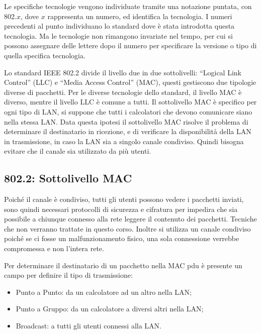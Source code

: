 \documentclass{article}
\numberwithin{equation}{subsection}
\begin{document}
Le specifiche tecnologie vengono individuate tramite una notazione puntata, con 802.$x$, dove $x$ rappresenta un numero, ed identifica la tecnologia. I numeri precedenti al punto individuano lo standard dove è 
stata introdotta questa tecnologia. Ma le tecnologie non rimangono invariate nel tempo, per cui si possono assegnare delle lettere dopo il numero per specificare la versione o tipo di quella specifica tecnologia. 

Lo standard IEEE 802.2 divide il livello due in due sottolivelli: ``Logical Link Control'' (LLC) e ``Media Access Control'' (MAC), questi gestiscono due tipologie diverse di pacchetti. Per le diverse tecnologie dello standard, il livello MAC è diverso, mentre il livello 
LLC è comune a tutti. 
Il sottolivello MAC è specifico per ogni tipo di LAN, si suppone che tutti i calcolatori che devono comunicare siano nella stessa LAN. Data questa ipotesi il sottolivello MAC risolve il problema di determinare 
il destinatario in ricezione, e di verificare la disponibilità della LAN in trasmissione, in caso la LAN sia a singolo canale condiviso. Quindi bisogna evitare che il canale sia utilizzato da più utenti. 

\subsection{802.2: Sottolivello MAC}

Poiché il canale è condiviso, tutti gli utenti possono vedere i pacchetti inviati, sono quindi necessari protocolli di sicurezza e cifratura per impedira che sia possibile a chiunque connesso alla rete leggere il 
contenuto dei pacchetti. Tecniche che non verranno trattate in questo corso. 
Inoltre si utilizza un canale condiviso poiché se ci fosse un malfunzionamento fisico, una sola connessione verrebbe compromessa e non l'intera rete. 

Per determinare il destinatario di un pacchetto nella MAC pdu è presente un campo per definire il tipo di trasmissione:
\begin{itemize}
  \item Punto a Punto: da un calcolatore ad un altro nella LAN;
  \item Punto a Gruppo: da un calcolatore a diversi altri nella LAN;
  \item Broadcast: a tutti gli utenti connessi alla LAN. 
\end{itemize}
\end{document}

